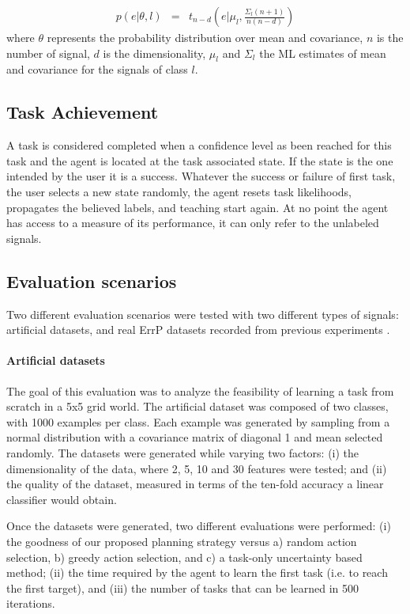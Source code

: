 \begin{eqnarray}
p(e|\theta, l) & = & t_{n-d}(e | \mu_l,\frac{\Sigma_l (n+1)}{n(n-d)})
\label{eq:prior}
\end{eqnarray}
where $\theta$ represents the probability distribution over mean and covariance, $n$ is the number of signal, $d$ is the dimensionality, $\mu_l$ and $\Sigma_l$ the ML estimates of mean and covariance for the signals of class $l$.

\subsection{Task Achievement}

A task is considered completed when a confidence level as been reached for this task and the agent is located at the task associated state. If the state is the one intended by the user it is a success. Whatever the success or failure of first task, the user selects a new state randomly, the agent resets task likelihoods, propagates the believed labels, and teaching start again. At no point the agent has access to a measure of its performance, it can only refer to the unlabeled signals.


\subsection{Evaluation scenarios}

Two different evaluation scenarios were tested with two different types of signals: artificial datasets, and real ErrP datasets recorded from previous experiments \cite{iturrate2013task}.

\paragraph{Artificial datasets}
The goal of this evaluation was to analyze the feasibility of learning a task from scratch in a 5x5 grid world. 
%
The artificial dataset was composed of two classes, with 1000 examples per class. Each example was generated by sampling from a normal distribution with a covariance matrix of diagonal 1 and mean selected randomly. The datasets were generated while varying two factors: (i) the dimensionality of the data, where 2, 5, 10 and 30 features were tested; and (ii) the quality of the dataset, measured in terms of the ten-fold accuracy a linear classifier would obtain. 

Once the datasets were generated, two different evaluations were performed: (i) the goodness of our proposed planning strategy versus a) random action selection, b) greedy action selection, and c) a task-only uncertainty based method; (ii) the time required by the agent to learn the first task (i.e. to reach the first target), and (iii) the number of tasks that can be learned in 500 iterations.


